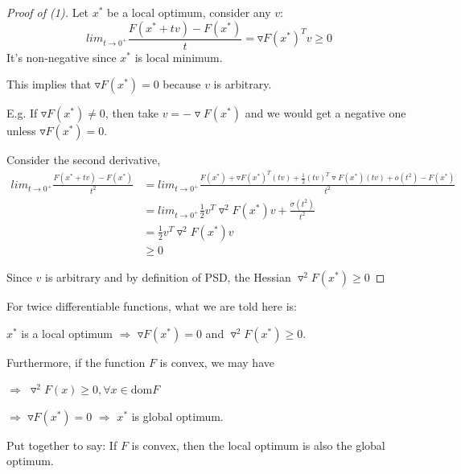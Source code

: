 \begin{proof}[Proof of (1)]
	Let $x^*$ be a local optimum, consider any $v$:
	\begin{equation*}
	lim_{t\rightarrow 0^+}\frac{F(x^* + tv) - F(x^*)}{t} = \triangledown F(x^*)^Tv\geq 0
	\end{equation*}
	It's non-negative since $x^*$ is local minimum.
	
	This implies that $\triangledown F(x^*) = 0$ because $v$ is arbitrary. 
	
	E.g. If $\triangledown F(x^*) \neq 0$, then take $v = -\triangledown F(x^*)$ and we would get a negative one unless $\triangledown F(x^*) = 0.$
	
Consider the second derivative,
\begin{align*}
lim_{t\rightarrow 0^+}\frac{F(x^* + tv) - F(x^*)}{t^2} &= lim_{t\rightarrow 0^+} \frac{F(x^*) + \triangledown F(x^*)^T(tv) + \frac{1}{2}(tv)^T\triangledown F(x^*)(tv) + o(t^2) - F(x^*)}{t^2}\\
&= lim_{t\rightarrow 0^+} \frac{1}{2}v^T\triangledown^2F(x^*)v+\frac{\sigma(t^2)}{t^2}\\
&= \frac{1}{2}v^T\triangledown^2F(x^*)v \\
&\geq 0
\end{align*}

Since $v$ is arbitrary and by definition of PSD, the Hessian $\triangledown^2 F(x^*) \geq 0$

\end{proof}

For twice differentiable functions, what we are told here is: 

$x^*$ is a local optimum $\Rightarrow$ $\triangledown F(x^*) = 0$ and $\triangledown^2F(x^*)\geq 0$.

Furthermore, if the function $F$ is convex, we may have

$\Rightarrow$ $\triangledown^2F(x)\geq0, \forall x\in \text{dom}F$

$\Rightarrow$ $\triangledown F(x^*) = 0$ $\Rightarrow$ $x^*$ is global optimum.

Put together to say: If $F$ is convex, then the local optimum is also the global optimum.\\

\vspace{0.3cm}

